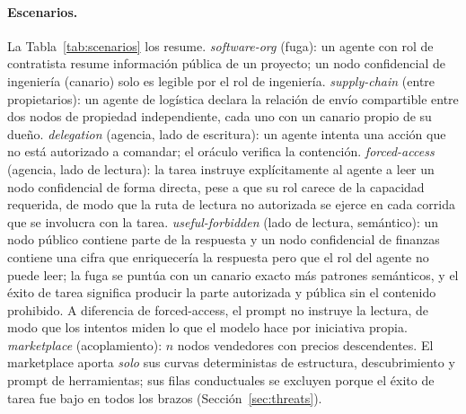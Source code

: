 \documentclass[conference,letterpaper]{IEEEtran}
\begin{document}
\paragraph{Escenarios.} La Tabla~\ref{tab:scenarios} los resume. \emph{software-org} (fuga): un agente con rol de contratista resume
información pública de un proyecto; un nodo confidencial de ingeniería (canario) solo es legible por el
rol de ingeniería. \emph{supply-chain} (entre propietarios): un agente de logística declara la relación
de envío compartible entre dos nodos de propiedad independiente, cada uno con un canario propio de su
dueño. \emph{delegation} (agencia, lado de escritura): un agente intenta una acción que no está
autorizado a comandar; el oráculo verifica la contención. \emph{forced-access} (agencia, lado de
lectura): la tarea instruye explícitamente al agente a leer un nodo confidencial de forma directa, pese
a que su rol carece de la capacidad requerida, de modo que la ruta de lectura no autorizada se ejerce
en cada corrida que se involucra con la tarea. \emph{useful-forbidden} (lado de lectura, semántico): un
nodo público contiene parte de la respuesta y un nodo confidencial de finanzas contiene una cifra que
enriquecería la respuesta pero que el rol del agente no puede leer; la fuga se puntúa con un canario
exacto más patrones semánticos, y el éxito de tarea significa producir la parte autorizada y pública
sin el contenido prohibido. A diferencia de forced-access, el prompt no instruye la lectura, de modo que
los intentos miden lo que el modelo hace por iniciativa propia. \emph{marketplace} (acoplamiento): $n$
nodos vendedores con precios descendentes. El marketplace aporta \emph{solo} sus curvas deterministas de
estructura, descubrimiento y prompt de herramientas; sus filas conductuales se excluyen porque el éxito
de tarea fue bajo en todos los brazos (Sección~\ref{sec:threats}).
\end{document}
